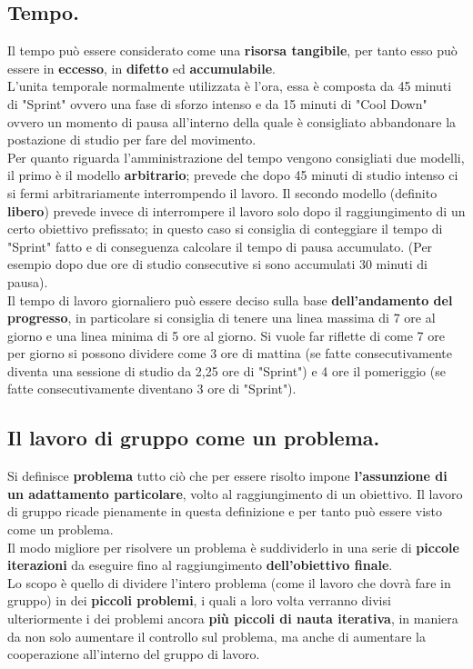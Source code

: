 \documentclass[11pt,a4paper]{article}
\begin{document}
	\subsection{Tempo.}
	 Il tempo può essere considerato come una \textbf{risorsa tangibile}, per tanto esso può essere in \textbf{eccesso}, in \textbf{difetto} ed \textbf{accumulabile}.\\
	L'unita temporale normalmente utilizzata è l'ora, essa è composta da 45 minuti di "Sprint" ovvero una fase di sforzo intenso e da 15 minuti di "Cool Down" ovvero un momento di pausa all'interno della quale è consigliato abbandonare la postazione di studio per fare del movimento. \\
	Per quanto riguarda l'amministrazione del tempo vengono consigliati due modelli, il primo è il  modello \textbf{arbitrario}; prevede che dopo 45 minuti di studio intenso ci si fermi arbitrariamente interrompendo il lavoro. Il secondo modello (definito \textbf{libero}) prevede invece di interrompere il lavoro solo dopo il raggiungimento di un certo obiettivo prefissato; in questo caso si consiglia di conteggiare il tempo di "Sprint" fatto e di conseguenza calcolare il tempo di pausa accumulato. (Per esempio dopo due ore di studio consecutive si sono accumulati 30 minuti di pausa).\\
	Il tempo di lavoro giornaliero può essere deciso sulla base \textbf{dell'andamento del progresso}, in particolare si consiglia di tenere una linea massima di 7 ore al giorno e una linea minima di 5 ore al giorno. Si vuole far riflette di come 7 ore per giorno si possono dividere come 3 ore di mattina (se fatte consecutivamente diventa una sessione di studio da 2,25 ore di "Sprint") e 4 ore il pomeriggio (se fatte consecutivamente diventano 3 ore di "Sprint").\\
	
	\subsection{Il lavoro di gruppo come un problema.} 
	Si definisce \textbf{problema} tutto ciò che per essere risolto impone \textbf{l'assunzione di un adattamento particolare}, volto al raggiungimento di un obiettivo. Il lavoro di gruppo ricade pienamente in questa definizione e per tanto può essere visto come un problema.\\
	Il modo migliore per risolvere un problema è suddividerlo in una serie di \textbf{piccole iterazioni} da eseguire fino al raggiungimento \textbf{dell'obiettivo finale}.\\
	Lo scopo è quello di dividere l'intero problema (come il lavoro che dovrà fare in gruppo) in dei \textbf{piccoli problemi}, i quali a loro volta verranno divisi ulteriormente i dei problemi ancora \textbf{più piccoli di nauta iterativa}, in maniera da non solo aumentare il controllo sul problema, ma anche di aumentare la cooperazione all'interno del gruppo di lavoro.\\ 
	
\end{document}
